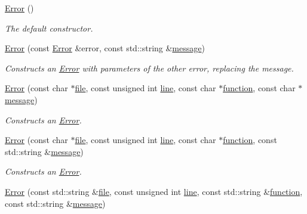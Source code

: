 \begin{DoxyCompactItemize}
\item 
\hyperlink{classdg_1_1deepcore_1_1_error_a943534a24622307ce6903bd92d5a60a8}{Error} ()
\begin{DoxyCompactList}\small\item\em The default constructor. \end{DoxyCompactList}\item 
\hyperlink{classdg_1_1deepcore_1_1_error_aeedd4c1e5e96e13e92eede0f9597a7eb}{Error} (const \hyperlink{classdg_1_1deepcore_1_1_error}{Error} \&error, const std\+::string \&\hyperlink{group___utility_module_ga7269ba8049ed86338733955565242539}{message})
\begin{DoxyCompactList}\small\item\em Constructs an \hyperlink{classdg_1_1deepcore_1_1_error}{Error} with parameters of the other error, replacing the message. \end{DoxyCompactList}\item 
\hyperlink{group___utility_module_ga345a7202460cb865e17cff4a78c7bcf6}{Error} (const char $\ast$\hyperlink{group___utility_module_ga0b75e32780cb8534179ff3c060739496}{file}, const unsigned int \hyperlink{group___utility_module_ga13437b5caffe754b7a32fc3c514907e5}{line}, const char $\ast$\hyperlink{group___utility_module_gaa69c98222c56544a9094154a8eab4db9}{function}, const char $\ast$\hyperlink{group___utility_module_ga7269ba8049ed86338733955565242539}{message})
\begin{DoxyCompactList}\small\item\em Constructs an \hyperlink{classdg_1_1deepcore_1_1_error}{Error}. \end{DoxyCompactList}\item 
\hyperlink{group___utility_module_gab98e5ffafca5efc6945f295698550854}{Error} (const char $\ast$\hyperlink{group___utility_module_ga0b75e32780cb8534179ff3c060739496}{file}, const unsigned int \hyperlink{group___utility_module_ga13437b5caffe754b7a32fc3c514907e5}{line}, const char $\ast$\hyperlink{group___utility_module_gaa69c98222c56544a9094154a8eab4db9}{function}, const std\+::string \&\hyperlink{group___utility_module_ga7269ba8049ed86338733955565242539}{message})
\begin{DoxyCompactList}\small\item\em Constructs an \hyperlink{classdg_1_1deepcore_1_1_error}{Error}. \end{DoxyCompactList}\item 
\hyperlink{group___utility_module_ga0e8a3ee91298ab22afb0d7146afa23fb}{Error} (const std\+::string \&\hyperlink{group___utility_module_ga0b75e32780cb8534179ff3c060739496}{file}, const unsigned int \hyperlink{group___utility_module_ga13437b5caffe754b7a32fc3c514907e5}{line}, const std\+::string \&\hyperlink{group___utility_module_gaa69c98222c56544a9094154a8eab4db9}{function}, const std\+::string \&\hyperlink{group___utility_module_ga7269ba8049ed86338733955565242539}{message})

\end{DoxyCompactItemize}

